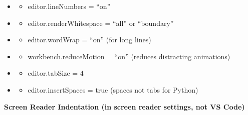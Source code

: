 \documentclass[
  justified,
  openright,
]{tufte-book}
\providecommand{\tightlist}{%
  \setlength{\itemsep}{0pt}\setlength{\parskip}{0pt}}
\begin{document}
\begin{itemize}
\tightlist
\item
  \begin{itemize}
  \tightlist
  \item[$\square$]
    editor.lineNumbers = ``on''
  \end{itemize}
\item
  \begin{itemize}
  \tightlist
  \item[$\square$]
    editor.renderWhitespace = ``all'' or ``boundary''
  \end{itemize}
\item
  \begin{itemize}
  \tightlist
  \item[$\square$]
    editor.wordWrap = ``on'' (for long lines)
  \end{itemize}
\item
  \begin{itemize}
  \tightlist
  \item[$\square$]
    workbench.reduceMotion = ``on'' (reduces distracting animations)
  \end{itemize}
\item
  \begin{itemize}
  \tightlist
  \item[$\square$]
    editor.tabSize = 4
  \end{itemize}
\item
  \begin{itemize}
  \tightlist
  \item[$\square$]
    editor.insertSpaces = true (spaces not tabs for Python)
  \end{itemize}
\end{itemize}

\textbf{Screen Reader Indentation (in screen reader settings, not VS
Code)}
\end{document}
